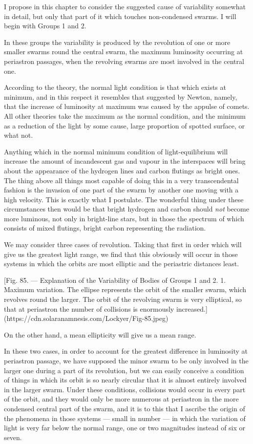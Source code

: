\documentclass[a4paper, 12pt, oneside, polutonikogreek, english]{article}
\begin{document}
I propose in this chapter to consider the suggested cause of variability somewhat in detail, but only that part of it which touches non-condensed swarms. I will begin with Groups 1 and 2.

In these groups the variability is produced by the revolution of one or more smaller swarms round the central swarm, the maximum luminosity occurring at periastron passages, when the revolving swarms are most involved in the central one.

According to the theory, the normal light condition is that which exists at minimum, and in this respect it resembles that suggested by Newton, namely, that the increase of luminosity at maximum was caused by the appulse of comets. All other theories take the maximum as the normal condition, and the minimum as a reduction of the light by some cause, large proportion of spotted surface, or what not.

Anything which in the normal minimum condition of light-equilibrium will increase the amount of incandescent gas and vapour in the interspaces will bring about the appearance of the hydrogen lines and carbon flutings as bright ones. The thing above all things most capable of doing this in a very transcendental fashion is the invasion of one part of the swarm by another one moving with a high velocity. This is exactly what I postulate. The wonderful thing under these circumstances then would be that bright hydrogen and carbon should \emph{not} become more luminous, not only in bright-line stars, but in those the spectrum of which consists of mixed flutings, bright carbon representing the radiation.

We may consider three cases of revolution. Taking that first in order which will give us the greatest light range, we find that this obviously will occur in those systems in which the orbits are most elliptic and the periastric distances least.

[Fig. 85. --- Explanation of the Variability of Bodies of Groups 1 and 2. 1. Maximum variation. The ellipse represents the orbit of the smaller swarm, which revolves round the larger. The orbit of the revolving swarm is very elliptical, so that at periastron the number of collisions is enormously increased.](https://cdn.solaranamnesis.com/Lockyer/Fig-85.jpeg)

On the other hand, a mean ellipticity will give us a mean range.

In these two cases, in order to account for the greatest difference in luminosity at periastron passage, we have supposed the minor swarm to be only involved in the larger one during a part of its revolution, but we can easily conceive a condition of things in which its orbit is so nearly circular that it is almost entirely involved in the larger swarm. Under these conditions, collisions would occur in every part of the orbit, and they would only be more numerous at periastron in the more condensed central part of the swarm, and it is to this that I ascribe the origin of the phenomena in those systems --- small in number --- in which the variation of light is very far below the normal range, one or two magnitudes instead of six or seven.
\end{document}
